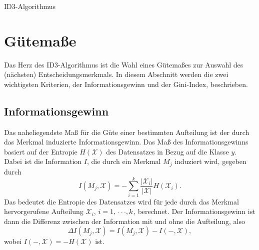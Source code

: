 		\begin{algorithm}  \DontPrintSemicolon
			\caption{ID3-Algorithmus}
			\label{alg:id3}
		\end{algorithm}

	\section{Gütemaße}
		\label{sec:treeQualityMeasures}

		Das Herz des ID3-Algorithmus ist die Wahl eines Gütemaßes zur Auswahl des (nächsten) Entscheidungsmerkmals. In diesem Abschnitt werden die zwei wichtigsten Kriterien, der Informationsgewinn und der Gini-Index, beschrieben.

		\subsection{Informationsgewinn}
			Das naheliegendste Maß für die Güte einer bestimmten Aufteilung ist der durch das Merkmal induzierte Informationsgewinn. Das Maß des Informationsgewinns basiert auf der Entropie \( H(\mathcal{X}) \) des Datensatzes in Bezug auf die Klasse \(y\). Dabei ist die Information \(I\), die durch ein Merkmal \(M_j\) induziert wird, gegeben durch
			\begin{equation}
				I(M_j, \mathcal{X}) = -\!\sum_{i = 1}^{k} \frac{\lvert \mathcal{X}_i \rvert}{\lvert \mathcal{X} \rvert} H(\mathcal{X}_i).
			\end{equation}
			Das bedeutet die Entropie des Datensatzes wird für jede durch das Merkmal hervorgerufene Aufteilung \( \mathcal{X}_i \), \( i = 1,\,\cdots\!,k \), berechnet. Der Informationsgewinn ist dann die Differenz zwischen der Information mit und ohne die Aufteilung, also
			\begin{equation}
				\Delta I(M_j, \mathcal{X}) = I(M_j, \mathcal{X}) - I(-, \mathcal{X}),
			\end{equation}
			wobei \( I(-, \mathcal{X}) = -H(\mathcal{X}) \) ist.


